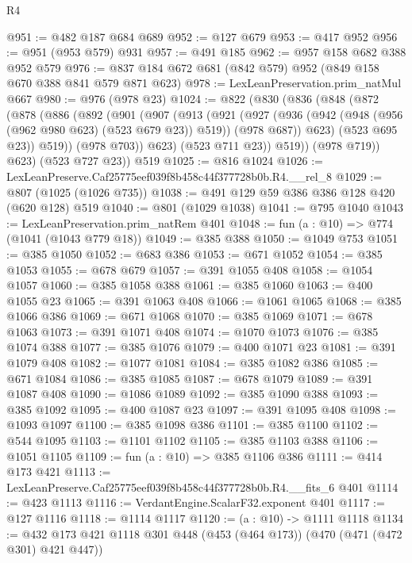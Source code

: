 \begin{lexlean}{R4}
\begin{coremodule}
@951 := @482 @187 @684 @689
@952 := @127 @679
@953 := @417 @952
@956 := @951 (@953 @579) @931
@957 := @491 @185
@962 := @957 @158 @682 @388 @952 @579
@976 := @837 @184 @672 @681 (@842 @579) @952 (@849 @158 @670 @388 @841 @579 @871 @623)
@978 := LexLeanPreservation.prim_natMul @667
@980 := @976 (@978 @23)
@1024 := @822
    (@830
      (@836
        (@848
          (@872
            (@878
              (@886
                (@892
                  (@901
                    (@907
                      (@913
                        (@921
                          (@927
                            (@936
                              (@942 (@948 (@956 (@962 @980 @623) (@523 @679 @23)) @519))
                              (@978 @687))
                            @623)
                          (@523 @695 @23))
                        @519))
                    (@978 @703))
                  @623)
                (@523 @711 @23))
              @519))
          (@978 @719))
        @623)
      (@523 @727 @23))
    @519
@1025 := @816 @1024
@1026 := LexLeanPreserve.Caf25775eef039f8b458c44f377728b0b.R4.__rel_8
@1029 := @807 (@1025 (@1026 @735))
@1038 := @491 @129 @59 @386 @386 @128 @420 (@620 @128) @519
@1040 := @801 (@1029 @1038)
@1041 := @795 @1040
@1043 := LexLeanPreservation.prim_natRem @401
@1048 := fun (a : @10) => @774 (@1041 (@1043 @779 @18))
@1049 := @385 @388
@1050 := @1049 @753
@1051 := @385 @1050
@1052 := @683 @386
@1053 := @671 @1052
@1054 := @385 @1053
@1055 := @678 @679
@1057 := @391 @1055 @408
@1058 := @1054 @1057
@1060 := @385 @1058 @388
@1061 := @385 @1060
@1063 := @400 @1055 @23
@1065 := @391 @1063 @408
@1066 := @1061 @1065
@1068 := @385 @1066 @386
@1069 := @671 @1068
@1070 := @385 @1069
@1071 := @678 @1063
@1073 := @391 @1071 @408
@1074 := @1070 @1073
@1076 := @385 @1074 @388
@1077 := @385 @1076
@1079 := @400 @1071 @23
@1081 := @391 @1079 @408
@1082 := @1077 @1081
@1084 := @385 @1082 @386
@1085 := @671 @1084
@1086 := @385 @1085
@1087 := @678 @1079
@1089 := @391 @1087 @408
@1090 := @1086 @1089
@1092 := @385 @1090 @388
@1093 := @385 @1092
@1095 := @400 @1087 @23
@1097 := @391 @1095 @408
@1098 := @1093 @1097
@1100 := @385 @1098 @386
@1101 := @385 @1100
@1102 := @544 @1095
@1103 := @1101 @1102
@1105 := @385 @1103 @388
@1106 := @1051 @1105
@1109 := fun (a : @10) => @385 @1106 @386
@1111 := @414 @173 @421
@1113 := LexLeanPreserve.Caf25775eef039f8b458c44f377728b0b.R4.__fits_6 @401
@1114 := @423 @1113
@1116 := VerdantEngine.ScalarF32.exponent @401
@1117 := @127 @1116
@1118 := @1114 @1117
@1120 := (a : @10) -> @1111 @1118
@1134 := @432 @173 @421 @1118 @301 @448 (@453 (@464 @173)) (@470 (@471 (@472 @301) @421 @447))

\end{coremodule}
\end{lexlean}
